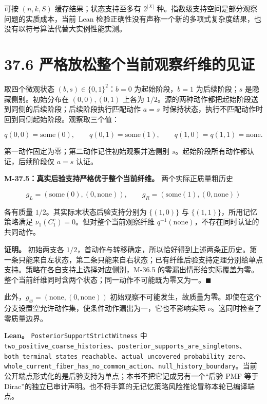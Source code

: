 \documentclass[
  11pt,
  oneside]{book}
\newcounter{none} %
\begin{document}
可按 \((n,k,S)\) 缓存结果；状态支持至多有 \(2^{|X|}\) 种。指数级支持空间是部分观察问题的实质成本，当前 Lean 检验正确性没有声称一个新的多项式复杂度结果，也没有以符号算法代替大实例性能实测。

\section{37.6 严格放松整个当前观察纤维的见证}\label{ux4e25ux683cux653eux677eux6574ux4e2aux5f53ux524dux89c2ux5bdfux7ea4ux7ef4ux7684ux89c1ux8bc1}

取四个微观状态 \((b,s)\in\{0,1\}^2\)：\(b=0\) 为起始阶段，\(b=1\) 为后续阶段；\(s\) 是隐藏侧别。初始分布在 \((0,0),(0,1)\) 上各为 \(1/2\)。源的两种动作都把起始阶段送到同侧的后续阶段；后续阶段执行匹配动作 \(a=s\) 时保持状态，执行不匹配动作时回到同侧起始阶段。观察取三个值：

\[q(0,0)=\mathrm{some}(0),\qquad
q(0,1)=\mathrm{some}(1),\qquad
q(1,0)=q(1,1)=\mathrm{none}.\]

第一动作固定为零；第二动作记住初始观察并选侧别 \(s\)。起始阶段所有动作都认证，后续阶段仅 \(a=s\) 认证。

\hypertarget{m-37-5}{}\label{m-37-5}

\textbf{M-37.5：真实后验支持严格优于整个当前纤维。} 两个实际正质量粗历史

\[g_L=(\mathrm{some}(0),(0,\mathrm{none})),\qquad
g_R=(\mathrm{some}(1),(0,\mathrm{none}))\]

各有质量 \(1/2\)。其实际末状态后验支持分别为 \(\{(1,0)\}\) 与 \(\{(1,1)\}\)，所用记忆策略满足 \(\nu_1(C_1^c)=0\)。但对整个当前观察纤维 \(q^{-1}(\mathrm{none})\)，不存在同时认证的共同动作。

\textbf{证明。} 初始两支各 \(1/2\)，首动作与转移确定，所以恰好得到上述两条正历史。第一条只能来自左状态，第二条只能来自右状态；已有纤维后验支持定理分别给单点支持。策略在各自支持上选择对应侧别，M-36.5 的零漏出情形给实际覆盖为零。整个当前纤维同时含两个状态；同一动作不可能既为零又为一。\(\blacksquare\)

此外，\(g_\varnothing=(\mathrm{none},(0,\mathrm{none}))\) 初始观察不可能发生，故质量为零。即使在这个分支设置空允许动作集，使条件动作漏出为一，它也不影响实际 \(\nu\)。这同时检查了零质量边界。

\textbf{Lean。} \nolinkurl{PosteriorSupportStrictWitness} 中 \nolinkurl{two_positive_coarse_histories}、\nolinkurl{posterior_supports_are_singletons}、\nolinkurl{both_terminal_states_reachable}、\nolinkurl{actual_uncovered_probability_zero}、\nolinkurl{whole_current_fiber_has_no_common_action}、\nolinkurl{null_history_boundary}。当前公开端点形式化的是后验支持为单点；本书不把它记成另有一个``后验 PMF 等于 Dirac''的独立已审计声明。也不将手算的无记忆策略风险推论冒称本轮已编译端点。
\end{document}
